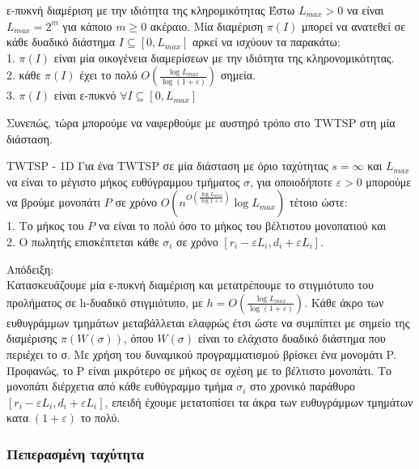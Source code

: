 \documentclass[oneside,12pt]{book}
\theoremstyle{definition}
\begin{document}
\begin{mylemma}{ε-πυκνή διαμέριση με την ιδιότητα της κληρομικότητας}{}
	Έστω \(L_{max} > 0\) να είναι \(L_{max} = 2^m\) για κάποιο \(m \geq 0\) ακέραιο. Μία διαμέριση \(π(I)\) μπορεί να ανατεθεί σε κάθε δυαδικό διάστημα \(I \subseteq [0,L_{max}]\) αρκεί να ισχύουν τα παρακάτω: \\
	1. \(π(Ι)\) είναι μία οικογένεια διαμερίσεων με την ιδιότητα της κληρονομικότητας. \\
	2. κάθε \(π(Ι)\) έχει το πολύ \(Ο(\frac{\log L_{max}}{\log (1+ε)})\) σημεία. \\
	3. \(π(Ι)\) είναι ε-πυκνό \(\forall I \subseteq [0,L_{max}]\)
\end{mylemma}

Συνεπώς, τώρα μπορούμε να ναφερθούμε με αυστηρό τρόπο στο TWTSP στη μία διάσταση. \\

\begin{mytheorem}{TWTSP - 1D}{}
	Για ένα TWTSP σε μία διάσταση με όριο ταχύτητας \(s = \infty\) και \(L_{max}\) να είναι το μέγιστο μήκος ευθύγραμμου τμήματος \(σ\), για οποιοδήποτε \(ε > 0\) μπορούμε να βρούμε μονοπάτι \(P\) σε χρόνο \(Ο(n^{O(\frac{\log L_{max}}{\log 1 + ε})} \log L_{max})\) τέτοιο ώστε: \\
	1. Το μήκος του \(P\) να είναι το πολύ όσο το μήκος του βέλτιστου μονοπατιού και \\
	2. Ο πωλητής επισκέπτεται κάθε \(σ_i\) σε χρόνο \([r_i - εL_i, d_i + εL_i]\). 
\end{mytheorem}

Απόδειξη: \\
Κατασκευάζουμε μία ε-πυκνή διαμέριση και μετατρέπουμε το στιγμιότυπο του προλήματος σε h-δυαδικό στιγμιότυπο, με \(h = O(\frac{\log L_{max}}{\log (1+ε)})\). Κάθε άκρο των ευθυγράμμων τμημάτων μεταβάλλεται ελαφρώς έτσι ώστε να συμπίπτει με σημείο της διαμέρισης \(π(W(σ))\), όπου \(W(σ)\) είναι το ελάχιστο δυαδικό διάστημα που περιέχει το σ. Με χρήση του δυναμικού προγραμματισμού βρίσκει ένα μονομάτι P. Προφανώς, το P είναι μικρότερο σε μήκος σε σχέση με το βέλτιστο μονοπάτι. Το μονοπάτι διέρχετια από κάθε ευθύγραμμο τμήμα \(σ_i\) στο χρονικό παράθυρο \([r_i - εL_i, d_i + εL_i]\), επειδή έχουμε μετατοπίσει τα άκρα των ευθυγράμμων τμημάτων κατα \((1+ε)\) το πολύ. 

\subsubsection{Πεπερασμένη ταχύτητα}
\end{document}
